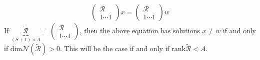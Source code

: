 \documentclass[12pt,reqno]{amsart}
\theoremstyle{definition}
\newcommand{\rank}{\mathrm{rank}}
\renewcommand{\dim}{\mathrm{dim}}
\begin{document}
\begin{align*}
  \begin{pmatrix} \mathcal{R} \\ 1 \cdots 1 \end{pmatrix} x 
  = \begin{pmatrix} \mathcal{R} \\ 1 \cdots 1 \end{pmatrix} w 
\end{align*}
If $\underbrace{\widetilde{\mathcal{R}}}_{(S+1) \times A}
=   \begin{pmatrix} \mathcal{R} \\ 1 \cdots  1 \end{pmatrix} $, then
the above equation has solutions $x \neq w$ 
if and only if $\dim \mathcal{N}(\widetilde{\mathcal{R}})> 0$. This will
be the case if and only if $\rank \widetilde{\mathcal{R}} < A$. 
\end{document}
